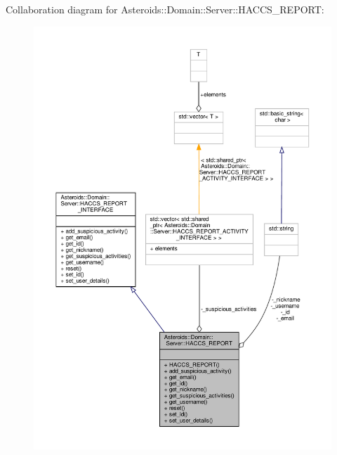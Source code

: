 Collaboration diagram for Asteroids\+:\+:Domain\+:\+:Server\+:\+:H\+A\+C\+C\+S\+\_\+\+R\+E\+P\+O\+RT\+:\nopagebreak
\begin{figure}[H]
\begin{center}
\leavevmode
\includegraphics[width=350pt]{classAsteroids_1_1Domain_1_1Server_1_1HACCS__REPORT__coll__graph}
\end{center}
\end{figure}
